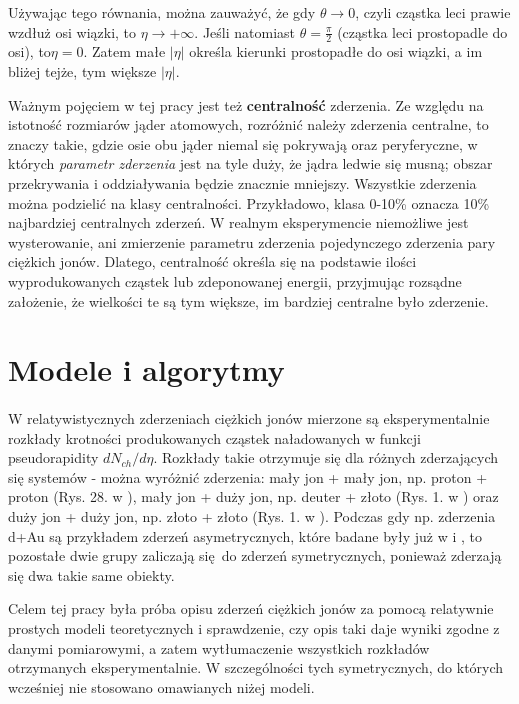 \documentclass[a4paper,12pt]{article}
\begin{document}
Używając tego równania, można zauważyć, że gdy $\theta \to 0$, czyli cząstka leci prawie wzdłuż osi wiązki, to $\eta \to + \infty$. Jeśli natomiast $\theta = \frac{\pi}{2}$ (cząstka leci prostopadle do osi), to$\eta = 0$.
Zatem małe $|\eta|$ określa kierunki prostopadłe do osi wiązki, a im bliżej tejże, tym większe $|\eta|$.

Ważnym pojęciem w tej pracy jest też \textbf{centralność} zderzenia. Ze względu na istotność rozmiarów jąder atomowych, rozróżnić należy zderzenia centralne, to znaczy takie, gdzie osie obu jąder niemal się pokrywają oraz peryferyczne, w których \textit{parametr zderzenia} jest na tyle duży, że jądra ledwie się musną; obszar przekrywania i oddziaływania będzie znacznie mniejszy. Wszystkie zderzenia można podzielić na klasy centralności. Przykładowo, klasa 0-10\% oznacza 10\% najbardziej centralnych zderzeń. W realnym eksperymencie niemożliwe jest wysterowanie, ani zmierzenie parametru zderzenia pojedynczego zderzenia pary ciężkich jonów. Dlatego, centralność określa się na podstawie ilości wyprodukowanych cząstek lub zdeponowanej energii, przyjmując rozsądne założenie, że wielkości te są tym większe, im bardziej centralne było zderzenie.


\newpage
\section{Modele i algorytmy}
\paragraph{}
W relatywistycznych zderzeniach ciężkich jonów mierzone są eksperymentalnie rozkłady krotności produkowanych cząstek naładowanych w funkcji pseudorapidity $dN_{ch}/d\eta$. Rozkłady takie otrzymuje się dla różnych zderzających się systemów - można wyróżnić zderzenia: mały jon + mały jon, np. proton + proton (Rys. 28. w \cite{Alver:2010ck}), mały jon + duży jon, np. deuter + złoto (Rys. 1. w \cite{Back:2004mr}) oraz duży jon + duży jon, np. złoto + złoto (Rys. 1. w \cite{Back:2002wb}). Podczas gdy np. zderzenia d+Au są przykładem zderzeń asymetrycznych, które badane były już w \cite{Barej:pracaInz18} i \cite{Barej:2017kcw}, to pozostałe dwie grupy zaliczają się do zderzeń symetrycznych, ponieważ zderzają się dwa takie same obiekty.

Celem tej pracy była próba opisu zderzeń ciężkich jonów za pomocą relatywnie prostych modeli teoretycznych i sprawdzenie, czy opis taki daje wyniki zgodne z danymi pomiarowymi, a zatem wytłumaczenie wszystkich rozkładów otrzymanych eksperymentalnie. W szczególności tych symetrycznych, do których wcześniej nie stosowano omawianych niżej modeli.
\end{document}
